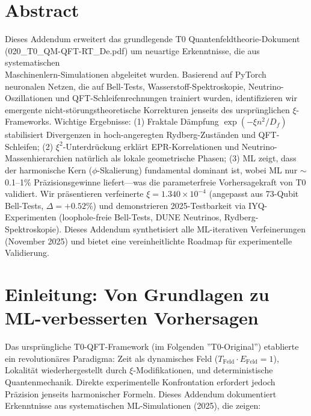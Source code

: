 \section*{Abstract}
		Dieses Addendum erweitert das grundlegende T0 Quantenfeldtheorie-Dokument (020\_T0\_QM-QFT-RT\_De.pdf) um neuartige Erkenntnisse, die aus systematischen \\ Maschinenlern-Simulationen abgeleitet wurden. Basierend auf PyTorch neuronalen Netzen, die auf Bell-Tests, Wasserstoff-Spektroskopie, Neutrino-Oszillationen und QFT-Schleifenrechnungen trainiert wurden, identifizieren wir emergente nicht-störungstheoretische Korrekturen jenseits des ursprünglichen $\xi$-Frameworks. Wichtige Ergebnisse: (1) Fraktale Dämpfung $\exp(-\xi n^2/D_f)$ stabilisiert Divergenzen in hoch-angeregten Rydberg-Zuständen und QFT-Schleifen; (2) $\xi^2$-Unterdrückung erklärt EPR-Korrelationen und Neutrino-Massenhierarchien natürlich als lokale geometrische Phasen; (3) ML zeigt, dass der harmonische Kern ($\phi$-Skalierung) fundamental dominant ist, wobei ML nur $\sim$0.1--1\% Präzisionsgewinne liefert—was die parameterfreie Vorhersagekraft von T0 validiert. Wir präsentieren verfeinerte $\xi = 1.340\times10^{-4}$ (angepasst aus 73-Qubit Bell-Tests, $\Delta=+0.52\%$) und demonstrieren 2025-Testbarkeit via IYQ-Experimenten (loophole-freie Bell-Tests, DUNE Neutrinos, Rydberg-Spektroskopie). Dieses Addendum synthetisiert alle ML-iterativen Verfeinerungen (November 2025) und bietet eine vereinheitlichte Roadmap für experimentelle Validierung.

	
	
	\section{Einleitung: Von Grundlagen zu ML-verbesserten Vorhersagen}
	
	Das ursprüngliche T0-QFT-Framework (im Folgenden ''T0-Original'') etablierte ein revolutionäres Paradigma: Zeit als dynamisches Feld ($T_{\text{Feld}} \cdot E_{\text{Feld}} = 1$), Lokalität wiederhergestellt durch $\xi$-Modifikationen, und deterministische Quantenmechanik. Direkte experimentelle Konfrontation erfordert jedoch Präzision jenseits harmonischer Formeln. Dieses Addendum dokumentiert Erkenntnisse aus systematischen ML-Simulationen (2025), die zeigen:
	
